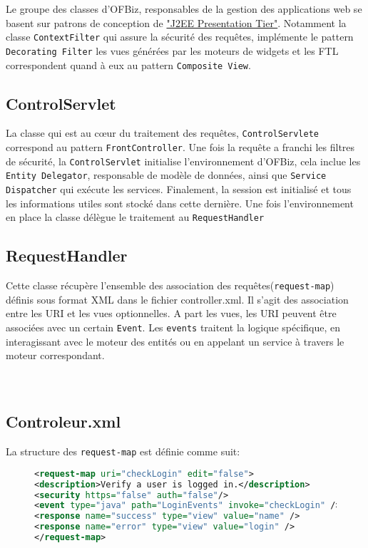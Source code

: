 Le groupe des classes d'OFBiz, responsables de la gestion des applications web se basent sur patrons de conception de   \href{http://www2.sys-con.com/itsg/virtualcd/java/archives/0701/malks/index.html}{"J2EE Presentation Tier"}. Notamment la classe \verb|ContextFilter| qui assure la sécurité des requêtes, implémente le pattern \verb|Decorating Filter|  les vues générées par les moteurs de widgets et les FTL correspondent quand à eux au pattern \verb|Composite View|.
\subsection{ControlServlet}
La classe qui est au cœur du traitement des requêtes, \verb|ControlServlete| correspond au pattern \verb|FrontController|.
Une fois la requête a franchi les filtres de sécurité, la \verb|ControlServlet| initialise l'environnement d'OFBiz, cela inclue les \verb|Entity Delegator|, responsable de modèle de données, ainsi que  \verb|Service Dispatcher| qui exécute les services. Finalement, la session est initialisé et tous les informations utiles sont stocké dans cette dernière. Une fois l'environnement en place la classe délègue le traitement au \verb|RequestHandler|

\subsection{RequestHandler}
Cette classe récupère l'ensemble des association des requêtes(\verb|request-map|) définis sous format XML dans le fichier controller.xml. Il s'agit des association entre les URI et les vues optionnelles. A part les vues, les URI peuvent être associées avec un certain \verb|Event|. Les \verb|events| traitent la logique spécifique, en interagissant avec le moteur des entités ou en appelant un service à travers le moteur correspondant. 
\\
\\
\\
\subsection{Controleur.xml}
La structure des \verb|request-map| est définie comme suit:
\begin{figure}[h!]
	\begin{lstlisting}[language=XML]
<request-map uri="checkLogin" edit="false">
<description>Verify a user is logged in.</description>
<security https="false" auth="false"/>
<event type="java" path="LoginEvents" invoke="checkLogin" />
<response name="success" type="view" value="name" />
<response name="error" type="view" value="login" />
</request-map>
	\end{lstlisting}
\end{figure}\\
\\
